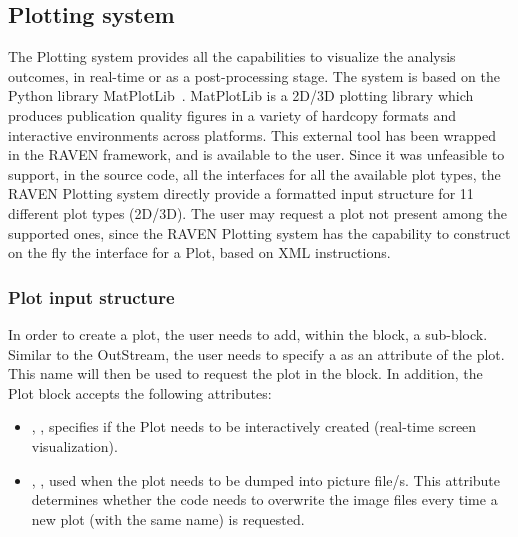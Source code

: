 \subsection{Plotting system \label{sec:plotting}}
The Plotting system provides all the capabilities to visualize the analysis
outcomes, in real-time or as a post-processing stage.
%
The system is based on the Python library MatPlotLib~\cite{MatPlotLib}.
%
MatPlotLib is a 2D/3D plotting library which produces publication quality
figures in a variety of hardcopy formats and interactive environments across
platforms.
%
This external tool has been wrapped in the RAVEN framework, and is available to
the user.
%
Since it was unfeasible to support, in the source code, all the interfaces for
all the available plot types, the RAVEN Plotting system directly provide a
formatted input structure for 11 different plot types (2D/3D).
%
The user may request a plot not present among the supported ones, since the
RAVEN Plotting system has the capability to construct on the fly the interface
for a Plot, based on XML instructions.
%
%
\subsubsection{Plot input structure \label{sec:PlotInputStructure}}
In order to create a plot, the user needs to add, within the
 block, a  sub-block.
%
Similar to the  OutStream, the user needs to specify a
 as an attribute of the plot.
%
This name will then be used to request the plot in the  block.
%
In addition, the Plot block accepts the following attributes:

\vspace{-5mm}
\begin{itemize}
  \itemsep0em
  \item {}, , specifies if
  the Plot needs to be interactively created (real-time screen visualization).
  \item {}, , used when the
  plot needs to be dumped into picture file/s. This attribute determines whether
  the code needs to overwrite the image files every time a new plot (with the
  same name) is requested.
\end{itemize}
\vspace{-5mm}

